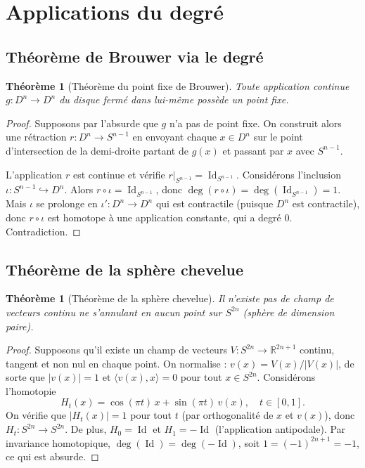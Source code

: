 \documentclass[12pt,a4paper,openany]{book}
\theoremstyle{definition}
\theoremstyle{plain}
\newtheorem{theoreme}[definition]{Théorème}
\theoremstyle{remark}
\newcommand{\R}{\mathbb{R}}
\DeclareMathOperator{\Id}{Id}
\newcommand{\abs}[1]{\left|#1\right|}
\begin{document}
\section{Applications du degré}\label{sec:degre-applications}

\subsection{Théorème de Brouwer via le degré}

\begin{theoreme}[Théorème du point fixe de Brouwer]\label{thm:brouwer-degre}
Toute application continue $g : D^n \to D^n$ du disque fermé dans lui-même
possède un point fixe.
\end{theoreme}

\begin{proof}
Supposons par l'absurde que $g$ n'a pas de point fixe. On construit alors une
rétraction $r : D^n \to S^{n-1}$ en envoyant chaque $x \in D^n$ sur le point
d'intersection de la demi-droite partant de $g(x)$ et passant par $x$ avec
$S^{n-1}$.

L'application $r$ est continue et vérifie $r|_{S^{n-1}} = \Id_{S^{n-1}}$.
Considérons l'inclusion $\iota : S^{n-1} \hookrightarrow D^n$. Alors
$r \circ \iota = \Id_{S^{n-1}}$, donc
$\deg(r \circ \iota) = \deg(\Id_{S^{n-1}}) = 1$. Mais $\iota$ se prolonge en
$\iota' : D^n \to D^n$ qui est contractile (puisque $D^n$ est contractile),
donc $r \circ \iota$ est homotope à une application constante, qui a degré $0$.
Contradiction.
\end{proof}

\subsection{Théorème de la sphère chevelue}

\begin{theoreme}[Théorème de la sphère chevelue]\label{thm:sphere-chevelue}
Il n'existe pas de champ de vecteurs continu ne s'annulant en aucun point sur
$S^{2n}$ (sphère de dimension paire).
\end{theoreme}

\begin{proof}
Supposons qu'il existe un champ de vecteurs $V : S^{2n} \to \R^{2n+1}$ continu,
tangent et non nul en chaque point. On normalise : $v(x) = V(x)/\abs{V(x)}$, de
sorte que $\abs{v(x)} = 1$ et $\langle v(x), x \rangle = 0$ pour tout
$x \in S^{2n}$. Considérons l'homotopie
\[
  H_t(x) = \cos(\pi t) \, x + \sin(\pi t) \, v(x), \quad t \in [0,1].
\]
On vérifie que $\abs{H_t(x)} = 1$ pour tout $t$ (par orthogonalité de $x$ et
$v(x)$), donc $H_t : S^{2n} \to S^{2n}$. De plus, $H_0 = \Id$ et
$H_1 = -\Id$ (l'application antipodale). Par invariance homotopique,
$\deg(\Id) = \deg(-\Id)$, soit $1 = (-1)^{2n+1} = -1$, ce qui est absurde.
\end{proof}
\end{document}
